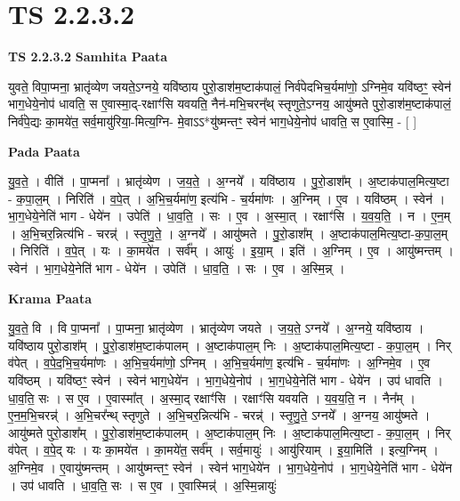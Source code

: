 \documentclass[17pt]{extarticle}
\begin{document}
\section*{ TS 2.2.3.2 }

\textbf{TS 2.2.3.2 } \newline
\textbf{Samhita Paata} \newline

युवते॒ विपा॒प्मना॒ भ्रातृ॑व्येण जयते॒ऽग्नये॒ यवि॑ष्ठाय पुरो॒डाश॑म॒ष्टाक॑पालं॒ निर्व॑पेदभिच॒र्यमा॑णो॒ ऽग्निमे॒व यवि॑ष्ठꣳ॒॒ स्वेन॑ भाग॒धेये॒नोप॑ धावति॒ स ए॒वास्मा॒द्-रक्षाꣳ॑सि यवयति॒ नैन॑-मभि॒चरन्᳚थ् स्तृणुते॒ऽग्नय॒ आयु॑ष्मते पुरो॒डाश॑म॒ष्टाक॑पालं॒ निर्व॑पे॒द्यः का॒मये॑त॒ सर्व॒मायु॑रिया॒-मित्य॒ग्नि- मे॒वाऽऽ*यु॑ष्मन्तꣳ॒॒ स्वेन॑ भाग॒धेये॒नोप॑ धावति॒ स ए॒वास्मि॒ - [  ] \newline

\textbf{Pada Paata} \newline

यु॒व॒ते॒ । वीति॑ । पा॒प्मना᳚ । भ्रातृ॑व्येण । ज॒य॒ते॒ । अ॒ग्नये᳚ । यवि॑ष्ठाय । पु॒रो॒डाश᳚म् । अ॒ष्टाक॑पाल॒मित्य॒ष्टा - क॒पा॒ल॒म् । निरिति॑ । व॒पे॒त् । अ॒भि॒च॒र्यमा॑ण॒ इत्य॑भि - च॒र्यमा॑णः । अ॒ग्निम् । ए॒व । यवि॑ष्ठम् । स्वेन॑ । भा॒ग॒धेये॒नेति॑ भाग - धेये॑न । उपेति॑ । धा॒व॒ति॒ । सः । ए॒व । अ॒स्मा॒त् । रक्षाꣳ॑सि । य॒व॒य॒ति॒ । न । ए॒न॒म् । अ॒भि॒चर॒न्नित्य॑भि - चरन्न्॑ । स्तृ॒णु॒ते॒ । अ॒ग्नये᳚ । आयु॑ष्मते । पु॒रो॒डाश᳚म् । अ॒ष्टाक॑पाल॒मित्य॒ष्टा-क॒पा॒ल॒म् । निरिति॑ । व॒पे॒त् । यः । का॒मये॑त । सर्व᳚म् । आयुः॑ । इ॒या॒म् । इति॑ । अ॒ग्निम् । ए॒व । आयु॑ष्मन्तम् । स्वेन॑ । भा॒ग॒धेये॒नेति॑ भाग - धेये॑न । उपेति॑ । धा॒व॒ति॒ । सः । ए॒व । अ॒स्मि॒न्न् ।  \newline


\textbf{Krama Paata} \newline

यु॒व॒ते॒ वि । वि पा॒प्मना᳚ । पा॒प्मना॒ भ्रातृ॑व्येण । भ्रातृ॑व्येण जयते । ज॒य॒ते॒ ऽग्नये᳚ । अ॒ग्नये॒ यवि॑ष्ठाय । यवि॑ष्ठाय पुरो॒डाश᳚म् । पु॒रो॒डाश॑म॒ष्टाक॑पालम् । अ॒ष्टाक॑पाल॒म् निः । अ॒ष्टाक॑पाल॒मित्य॒ष्टा - क॒पा॒ल॒म् । निर् व॑पेत् । व॒पे॒द॒भि॒च॒र्यमा॑णः । अ॒भि॒च॒र्यमा॑णो॒ ऽग्निम् । अ॒भि॒च॒र्यमा॑ण॒ इत्य॑भि - च॒र्यमा॑णः । अ॒ग्निमे॒व । ए॒व यवि॑ष्ठम् । यवि॑ष्ठꣳ॒॒ स्वेन॑ । स्वेन॑ भाग॒धेये॑न । भा॒ग॒धेये॒नोप॑ । भा॒ग॒धेये॒नेति॑ भाग - धेये॑न । उप॑ धावति । धा॒व॒ति॒ सः । स ए॒व । ए॒वास्मा᳚त् । अ॒स्मा॒द् रक्षाꣳ॑सि । रक्षाꣳ॑सि यवयति । य॒व॒य॒ति॒ न । नैन᳚म् । ए॒न॒म॒भि॒चरन्न्॑ । अ॒भि॒चर᳚न्थ् स्तृणुते । अ॒भि॒चर॒न्नित्य॑भि - चरन्न्॑ । स्तृ॒णु॒ते॒ ऽग्नये᳚ । अ॒ग्नय॒ आयु॑ष्मते । आयु॑ष्मते पुरो॒डाश᳚म् । पु॒रो॒डाश॑म॒ष्टाक॑पालम् । अ॒ष्टाक॑पाल॒म् निः । अ॒ष्टाक॑पाल॒मित्य॒ष्टा - क॒पा॒ल॒म् । निर् व॑पेत् । व॒पे॒द् यः । यः का॒मये॑त । का॒मये॑त॒ सर्व᳚म् । सर्व॒मायुः॑ । आयु॑रियाम् । इ॒या॒मिति॑ । इत्य॒ग्निम् । अ॒ग्निमे॒व । ए॒वायु॑ष्मन्तम् । आयु॑ष्मन्तꣳ॒॒ स्वेन॑ । स्वेन॑ भाग॒धेये॑न । भा॒ग॒धेये॒नोप॑ । भा॒ग॒धेये॒नेति॑ भाग - धेये॑न । उप॑ धावति । धा॒व॒ति॒ सः । स ए॒व । ए॒वास्मिन्न्॑ । अ॒स्मि॒न्नायुः॑ \newline
\end{document}

